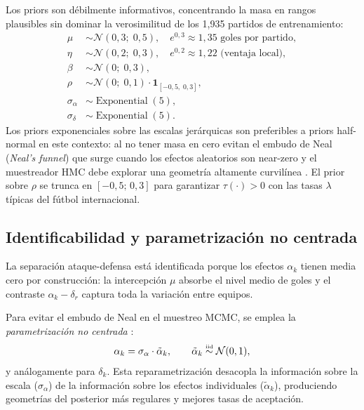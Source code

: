 \documentclass[12pt,a4paper]{article}
\newcommand{\iid}{\overset{\text{\tiny iid}}{\sim}}
\begin{document}
Los priors son débilmente informativos, concentrando la masa en rangos
plausibles sin dominar la verosimilitud de los 1{,}935 partidos de entrenamiento:
\begin{align}
  \mu          &\sim \mathcal{N}(0{,}3;\; 0{,}5),
    \quad e^{0{,}3} \approx 1{,}35 \text{ goles por partido},
    \label{eq:prior-mu}\\
  \eta         &\sim \mathcal{N}(0{,}2;\; 0{,}3),
    \quad e^{0{,}2} \approx 1{,}22 \text{ (ventaja local)},
    \label{eq:prior-eta}\\
  \beta        &\sim \mathcal{N}(0;\; 0{,}3),
    \label{eq:prior-beta}\\
  \rho         &\sim \mathcal{N}(0;\; 0{,}1) \cdot \mathbf{1}_{[-0{,}5,\; 0{,}3]},
    \label{eq:prior-rho}\\
  \sigma_\alpha &\sim \operatorname{Exponential}(5),
    \label{eq:prior-sigma-a}\\
  \sigma_\delta &\sim \operatorname{Exponential}(5).
    \label{eq:prior-sigma-d}
\end{align}
Los priors exponenciales sobre las escalas jerárquicas son preferibles a
priors half-normal en este contexto: al no tener masa en cero evitan el
embudo de Neal (\textit{Neal's funnel}) que surge cuando los efectos aleatorios
son near-zero y el muestreador HMC debe explorar una geometría altamente
curvilínea \citep{gelman2013bayesian}.
El prior sobre $\rho$ se trunca en $[-0{,}5;\, 0{,}3]$ para garantizar
$\tau(\cdot) > 0$ con las tasas $\lambda$ típicas del fútbol internacional.

\subsection{Identificabilidad y parametrización no centrada}

La separación ataque-defensa está identificada porque los efectos $\alpha_k$
tienen media cero por construcción: la intercepción $\mu$ absorbe el nivel
medio de goles y el contraste $\alpha_{k} - \delta_{r}$ captura toda la
variación entre equipos.

Para evitar el embudo de Neal en el muestreo MCMC, se emplea la
\textit{parametrización no centrada} \citep{papaspiliopoulos2007general}:
\begin{equation}
  \alpha_k = \sigma_\alpha \cdot \tilde{\alpha}_k,
  \qquad \tilde{\alpha}_k \iid \mathcal{N}(0, 1),
  \label{eq:noncentered}
\end{equation}
y análogamente para $\delta_k$.
Esta reparametrización desacopla la información sobre la escala ($\sigma_\alpha$)
de la información sobre los efectos individuales ($\tilde{\alpha}_k$),
produciendo geometrías del posterior más regulares y mejores tasas de aceptación.
\end{document}
